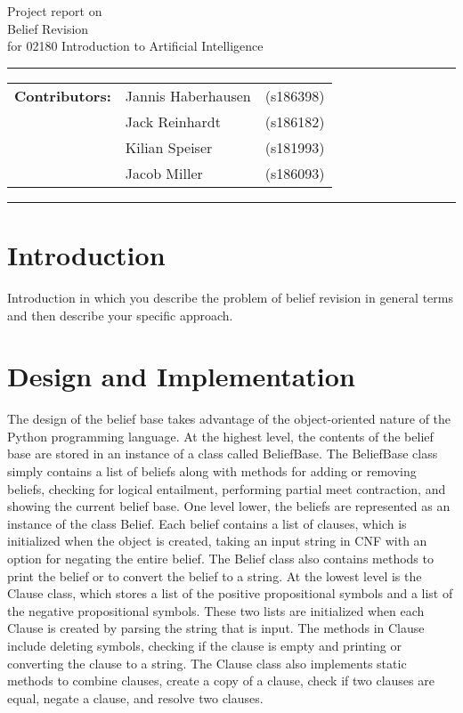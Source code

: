 \documentclass[a4paper,10pt]{article}
\begin{document}
\begin{center}
Project report on\\
\vspace{0.5cm}
{{\Large \sc Belief Revision}} \\
\vspace{0.5cm} for 02180 Introduction to Artificial Intelligence
\end{center}
\rule{\textwidth}{0.5pt}
\begin{description}
\item\begin{tabular}{rll}
    \textbf{Contributors:}  & Jannis Haberhausen  & (s186398) \\
                            & Jack Reinhardt      & (s186182) \\
                            & Kilian Speiser      & (s181993) \\
                            & Jacob Miller        & (s186093) \\
\end{tabular}
\end{description}
\rule{\textwidth}{1pt}

\tableofcontents
\newpage

\section{Introduction}
\label{sec:intro}
Introduction in which you describe the problem of belief revision in general terms and then describe your specific approach.

\section{Design and Implementation}
\label{sec:design}
The design of the belief base takes advantage of the object-oriented nature of the Python programming language. At the highest level, the contents of the belief base are stored in an instance of a class called BeliefBase. The BeliefBase class simply contains a list of beliefs along with methods for adding or removing beliefs, checking for logical entailment, performing partial meet contraction, and showing the current belief base. One level lower, the beliefs are represented as an instance of the class Belief. Each belief contains a list of clauses, which is initialized when the object is created, taking an input string in CNF with an option for negating the entire belief. The Belief class also contains methods to print the belief or to convert the belief to a string. At the lowest level is the Clause class, which stores a list of the positive propositional symbols and a list of the negative propositional symbols. These two lists are initialized when each Clause is created by parsing the string that is input. The methods in Clause include deleting symbols, checking if the clause is empty and printing or converting the clause to a string. The Clause class also implements static methods to combine clauses, create a copy of a clause, check if two clauses are equal, negate a clause, and resolve two clauses.
\end{document}
